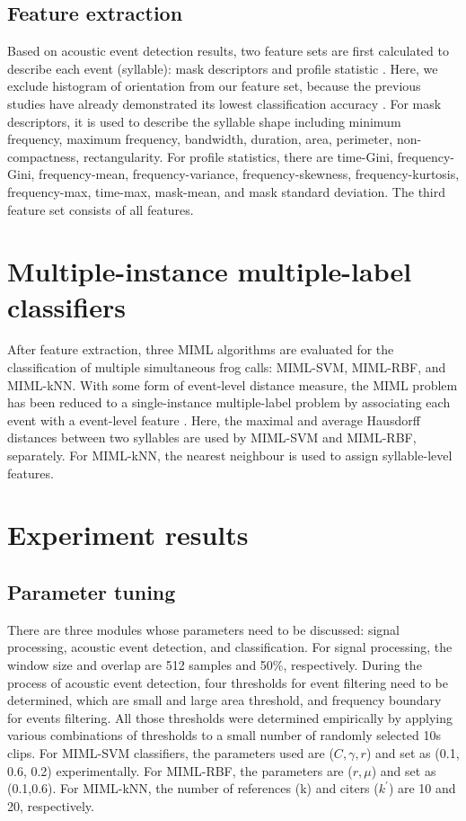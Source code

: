 \subsection{Feature extraction}
Based on acoustic event detection results, two feature sets are first calculated to describe each event (syllable): mask descriptors and profile statistic \cite{briggs2012acoustic}. Here, we exclude histogram of orientation from our feature set, because the previous studies have already demonstrated its lowest classification accuracy \cite{briggs2012acoustic, ruizmultiple2015}. For mask descriptors, it is used to describe the syllable shape including minimum frequency, maximum frequency, bandwidth, duration, area, perimeter, non-compactness, rectangularity. For profile statistics, there are time-Gini, frequency-Gini, frequency-mean, frequency-variance, frequency-skewness, frequency-kurtosis, frequency-max, time-max, mask-mean, and mask standard deviation. The third feature set consists of all features.







\section{Multiple-instance multiple-label classifiers}
After feature extraction, three MIML algorithms are evaluated for the classification of multiple  simultaneous frog calls: MIML-SVM, MIML-RBF, and MIML-kNN. With some form of event-level distance measure, the MIML problem has been reduced to a single-instance multiple-label problem by associating each event with a event-level feature \cite{briggs2012acoustic}. Here, the maximal and average Hausdorff distances between two syllables are used by MIML-SVM and MIML-RBF, separately. For MIML-kNN, the nearest neighbour is used to assign syllable-level features. 


\section{Experiment results}

\subsection{Parameter tuning}
There are three modules whose parameters need to be discussed: signal processing, acoustic event detection, and classification. For signal processing, the window size and overlap are 512 samples and 50\%, respectively. During the process of acoustic event detection, four thresholds for event filtering need to be determined, which are small and large area threshold, and frequency boundary for events filtering. All those thresholds were determined empirically by applying various combinations of thresholds to a small number of randomly selected 10s clips. For MIML-SVM classifiers, the parameters used are ($C,\gamma,r$) and set as (0.1, 0.6, 0.2) experimentally. For MIML-RBF, the parameters are ($ r, \mu$) and set as (0.1,0.6). For MIML-kNN, the number of references (k) and citers ($k^{'}$) are 10 and 20, respectively.
 
